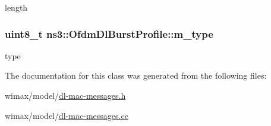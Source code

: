 length 

\subsubsection[{\texorpdfstring{m\+\_\+type}{m_type}}]{\setlength{\rightskip}{0pt plus 5cm}uint8\+\_\+t ns3\+::\+Ofdm\+Dl\+Burst\+Profile\+::m\+\_\+type\hspace{0.3cm}{\ttfamily [private]}}\hypertarget{classns3_1_1OfdmDlBurstProfile_afade9f6d4968257e2d707fefb724db1a}{}\label{classns3_1_1OfdmDlBurstProfile_afade9f6d4968257e2d707fefb724db1a}


type 



The documentation for this class was generated from the following files\+:\begin{DoxyCompactItemize}
\item 
wimax/model/\hyperlink{dl-mac-messages_8h}{dl-\/mac-\/messages.\+h}\item 
wimax/model/\hyperlink{dl-mac-messages_8cc}{dl-\/mac-\/messages.\+cc}\end{DoxyCompactItemize}
